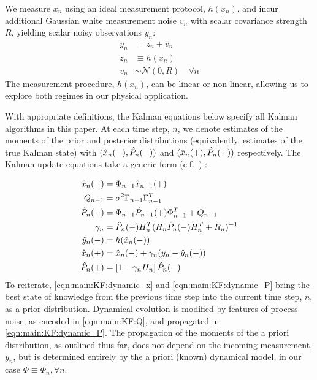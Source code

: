 We measure $x_n$ using an ideal measurement protocol, $h(x_n)$, and incur additional Gaussian white measurement noise $v_n$ with scalar covariance strength $R$, yielding scalar noisy observations $y_n$:
\begin{align}
	y_n &= z_n + v_n \\
	z_n & \equiv  h(x_n) \\
	v_n & \sim \mathcal{N}(0, R) \quad \forall n
\end{align}
The measurement procedure, $h(x_n)$, can be linear or non-linear, allowing us to explore both regimes in our physical application.

With appropriate definitions, the Kalman equations below specify all Kalman algorithms in this paper. At each time step, $n$, we denote estimates of the moments of the prior and posterior distributions (equivalently, estimates of the true Kalman state) with $(\hat{x}_{n}(-), \hat{P}_{n}(-))$ and $(\hat{x}_{n}(+), \hat{P}_{n}(+))$ respectively. The Kalman update equations take a generic form (c.f.~\cite{grewal2001theory}) :

\begin{align}
	\hat{x}_{n}(-) & = \Phi_{n-1} \hat{x}_{n-1}(+) \label{eqn:main:KF:dynamic_x}\\ 
	Q_{n-1} & = \sigma^2 \Gamma_{n-1}\Gamma_{n-1}^T  \label{eqn:main:KF:Q}\\
	\hat{P}_{n}(-)&= \Phi_{n-1} \hat{P}_{n-1}(+) \Phi_{n-1}^T + Q_{n-1} \label{eqn:main:KF:dynamic_P}\\
	\gamma_n &= \hat{P}_{n}(-) H_n^T(H_n\hat{P}_{n}(-)H_n^T + R_n)^{-1} \label{eqn:main:KF:gain}\\
	\hat{y}_n(-) & = h(\hat{x}_{n}(-)) \label{eqn:main:KF:step_ahead}\\
	\hat{x}_{n}(+) &= \hat{x}_{n}(-) + \gamma_n (y_n - \hat{y}_n(-)) \label{eqn:main:KF:bayesian_x}\\
	\hat{P}_{n}(+) &= \left[1  - \gamma_n H_n \right] \hat{P}_{n}(-) \label{eqn:main:KF:bayesian_p}
\end{align}
To reiterate, \cref{eqn:main:KF:dynamic_x} and \cref{eqn:main:KF:dynamic_P} bring the best state of knowledge from the previous time step into the current time step, $n$, as a prior distribution. Dynamical evolution is modified by features of process noise, as encoded in \cref{eqn:main:KF:Q}, and propagated in \cref{eqn:main:KF:dynamic_P}. The propagation of the moments of the a priori distribution, as outlined thus far, does not depend on the incoming measurement, $y_n$, but is determined entirely by the a priori (known) dynamical model, in our case $\Phi \equiv \Phi_n, \forall n$. 


